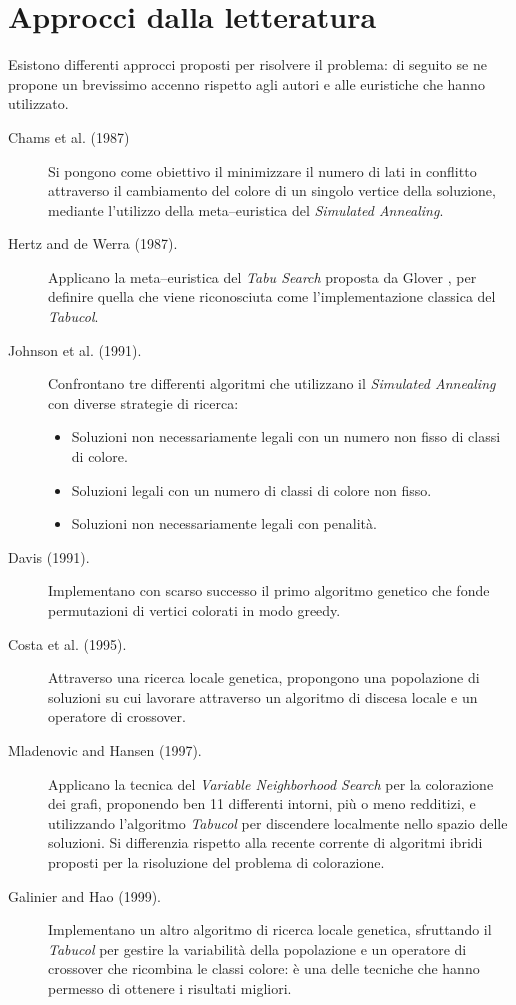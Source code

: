 \documentclass[a4paper,10pt]{article}
\newcommand{\tabucol}{\emph{Tabucol}}
\begin{document}
\section{Approcci dalla letteratura}
Esistono differenti approcci proposti per risolvere il problema: di seguito se ne propone un brevissimo accenno rispetto agli autori e alle euristiche che hanno utilizzato.

\begin{description}
\item[Chams et al. (1987)] Si pongono come obiettivo il minimizzare il numero di lati in conflitto attraverso il cambiamento del colore di un singolo vertice della soluzione, mediante l'utilizzo della meta--euristica del \emph{Simulated Annealing}.

\item[Hertz and de Werra (1987).] Applicano la meta--euristica del \emph{Tabu Search} proposta da Glover \cite{tabusearch}, per definire quella che viene riconosciuta come l'implementazione classica del \tabucol{}.

\item[Johnson et al. (1991).] Confrontano tre differenti algoritmi che utilizzano il \emph{Simulated Annealing} con diverse strategie di ricerca:
\begin{itemize}
 \item Soluzioni non necessariamente legali con un numero non fisso di classi di colore.
 \item Soluzioni legali con un numero di classi di colore non fisso.
 \item Soluzioni non necessariamente legali con penalità. 
\end{itemize}

\item[Davis (1991).] Implementano con scarso successo il primo algoritmo genetico che fonde permutazioni di vertici colorati in modo greedy.

\item[Costa et al. (1995).] Attraverso una ricerca locale genetica, propongono una popolazione di soluzioni su cui lavorare attraverso un algoritmo di discesa locale e un operatore di crossover.

\item[Mladenovic and Hansen (1997).] Applicano la tecnica del \emph{Variable Neighborhood Search} per la colorazione dei grafi, proponendo ben 11 differenti intorni, più o meno redditizi, e utilizzando l'algoritmo \tabucol{} per discendere localmente nello spazio delle soluzioni. Si differenzia rispetto alla recente corrente di algoritmi ibridi proposti per la risoluzione del problema di colorazione.

\item[Galinier and Hao (1999).] Implementano un altro algoritmo di ricerca locale genetica, sfruttando il \tabucol{} per gestire la variabilità della popolazione e un operatore di crossover che ricombina le classi colore: è una delle tecniche che hanno permesso di ottenere i risultati migliori.
\end{description}
\end{document}
